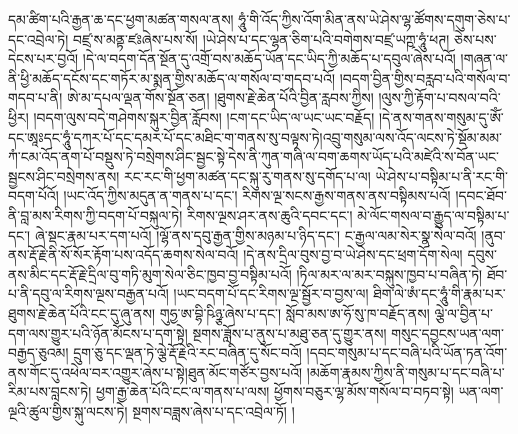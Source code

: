 དམ་ཚིག་པའི་རྒྱན་ཆ་དང་ཕྱག་མཚན་གསལ་ནས། ཧཱུཾ་གི་འོད་ཀྱིས་འོག་མིན་ནས་ཡེ་ཤེས་ལྷ་ཚོགས་དགུག་ཅེས་པ་དང་འབྲེལ་ཏེ། བཛྲ་ས་མནྟ་ཛཿཞེས་པས་སོ། །ཡེ་ཤེས་པ་དང་ལྷན་ཅིག་པའི་བགེགས་བཛྲ་ཡཀྵ་ཧཱུཾ་ཕཊ། ཅེས་པས་དེངས་པར་བྱའོ། །དེ་ལ་བདག་དོན་སྔོན་དུ་འགྲོ་བས་མཆོད་ཡོན་དང་ཡིད་ཀྱི་མཆོད་པ་དབུལ་ཞེས་པའོ། །གཞན་ལ་ནི་ཕྱི་མཆོད་དངོས་དང་གཏོར་མ་སྨན་གྱིས་མཆོད་ལ་གསོལ་བ་གདབ་པའོ། །བདག་བྱིན་གྱིས་བརླབ་པའི་གསོལ་བ་གདབ་པ་ནི། ཨེ་མ་དཔལ་ལྡན་གོས་སྔོན་ཅན། །ཐུགས་རྗེ་ཆེན་པོའི་བྱིན་རླབས་ཀྱིས། །ལུས་ཀྱི་རྟོག་པ་བསལ་བའི་ཕྱིར། །བདག་ལུས་བདེ་གཤེགས་སྐུར་བྱིན་རློབས། །ངག་དང་ཡིད་ལ་ཡང་ཡང་བརྗོད། །དེ་ནས་གནས་གསུམ་དུ་ཨོཾ་དང་ཨཱཿདང་ཧཱུཾ་དཀར་པོ་དང་དམར་པོ་དང་མཐིང་ག་གནས་སུ་བལྟས་ཏེ།འབྲུ་གསུམ་ལས་འོད་ལངས་ཏེ་སྡོམ་མམ་ཀཾ་ངམ་འོད་ནག་པོ་བསྡུས་ཏེ་བསྲེགས་ཤིང་སྦྱང་སྟེ་དེས་ནི་ཀུན་གཞི་ལ་བག་ཆགས་ཡོད་པའི་མཛེའི་ས་བོན་ཡང་སྦྱངས་ཤིང་བསྲེགས་ནས། རང་རང་གི་ཕྱག་མཚན་དང་སྐུ་རུ་གནས་སུ་དགོད་པ་ལ། ཡེ་ཤེས་པ་བསྟིམ་པ་ནི་རང་གི་བདག་པོའོ། །ཡང་འོད་ཀྱིས་མདུན་ན་གནས་པ་དང་། རིགས་ལྔ་སངས་རྒྱས་གནས་ནས་བསྟིམས་པའོ། །དབང་ཐོབ་ནི་བླ་མས་རིགས་ཀྱི་བདག་པོ་བསྐུལ་ཏེ། རིགས་ལྔས་ཤར་ནས་ཆུའི་དབང་དང་། མེ་ལོང་གསལ་བ་རྒྱུད་ལ་བསྟིམ་པ་དང་། ཞེ་སྡང་རྣམ་པར་དག་པའོ། །ལྷོ་ནས་དབུ་རྒྱན་གྱིས་མཉམ་པ་ཉིད་དང་། ང་རྒྱལ་ལམ་སེར་སྣ་སེལ་བའོ། །ནུབ་ནས་རྡོ་རྗེ་ནི་སོ་སོར་རྟོག་པས་འདོད་ཆགས་སེལ་བའོ། །དེ་ནས་དྲིལ་བུས་བྱ་བ་ཡེ་ཤེས་དང་ཕྲག་དོག་སེལ། དབུས་ནས་མིང་དང་རྡོ་རྗེ་དྲིལ་བུ་གཏི་མུག་སེལ་ཅིང་ཁྱབ་བྱ་བསྟིམ་པའོ། །ཏིལ་མར་ལ་མར་བསྐུས་ཁྱབ་པ་བཞིན་ཏེ། ཐོབ་པ་ནི་དབུ་ལ་རིགས་ལྔས་བརྒྱན་པའོ། །ཡང་བདག་པོ་དང་རིགས་ལྔ་སྦྱོར་བ་བྱས་ལ། ཐིག་ལེ་ཨཾ་དང་ཧཱུཾ་གི་རྣམ་པར་ཐུགས་རྗེ་ཆེན་པོའི་ངང་དུ་ཞུ་ནས། གུཧྱ་ཨ་བྷི་ཥིཉྩ་ཞེས་པ་དང་། སློབ་མས་ཨ་ཧོ་སུ་ཁ་བརྗོད་ནས། ལྕེ་ལ་བྱིན་པ་དག་ལས་གྱུར་པའི་ཉོན་མོངས་པ་དག་སྟེ། སྔགས་ཟློས་པ་ནུས་པ་མཐུ་ཅན་དུ་གྱུར་ནས། གསུང་དབྱངས་ཡན་ལག་བརྒྱད་ཅུའམ། དྲུག་ཅུ་དང་ལྡན་ཏེ་ལྕེ་རྡོ་རྗེའི་རང་བཞིན་དུ་སོང་བའོ། །དབང་གསུམ་པ་དང་བཞི་པའི་ཡོན་ཏན་འོག་ནས་གོང་དུ་འཕེལ་བར་འགྱུར་ཞེས་པ་སྟེ།ཐུན་མོང་གཙོར་བྱས་པའོ། །མཆོག་རྣམས་ཀྱིས་ནི་གསུམ་པ་དང་བཞི་པ་རིམ་པས་བླངས་ཏེ། ཕྱག་རྒྱ་ཆེན་པོའི་ངང་ལ་གནས་པ་ལས། ཕྱོགས་བཅུར་ལྷ་མོས་གསོལ་བ་བཏབ་སྟེ། ཡན་ལག་ལྔའི་ཚུལ་གྱིས་སྐུ་ལངས་ཏེ། སྔགས་བཟླས་ཞེས་པ་དང་འབྲེལ་ཏོ། །
